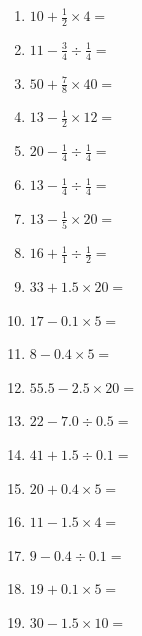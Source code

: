 \documentclass[12pt]{article}
\begin{document}
\begin{enumerate}
\item \large $ 10 + \frac{1}{2} \times 4 = $ \vspace{1.6cm}
\item \large $ 11 - \frac{3}{4} \div \frac{1}{4} = $ \vspace{1.6cm}
\item \large $ 50 + \frac{7}{8} \times 40 = $ \vspace{1.6cm}
\newpage
\item \large $ 13 - \frac{1}{2} \times 12 = $ \vspace{1.6cm}
\item \large $ 20 - \frac{1}{4} \div \frac{1}{4} = $ \vspace{1.6cm}
\item \large $ 13 - \frac{1}{4} \div \frac{1}{4} = $ \vspace{1.6cm}
\item \large $ 13 - \frac{1}{5} \times 20 = $ \vspace{1.6cm}
\item \large $ 16 + \frac{1}{1} \div \frac{1}{2} = $ \vspace{1.6cm}
\item \large $ 33 + 1.5 \times 20 = $ \vspace{1.6cm}
\item \large $ 17 - 0.1 \times 5 = $ \vspace{1.6cm}
\item \large $ 8 - 0.4 \times 5 = $ \vspace{1.6cm}
\item \large $ 55.5 - 2.5 \times 20 = $ \vspace{1.6cm}
\item \large $ 22 - 7.0 \div 0.5 = $ \vspace{1.6cm}
\newpage
\item \large $ 41 + 1.5 \div 0.1 = $ \vspace{1.6cm}
\item \large $ 20 + 0.4 \times 5 = $ \vspace{1.6cm}
\item \large $ 11 - 1.5 \times 4 = $ \vspace{1.6cm}
\item \large $ 9 - 0.4 \div 0.1 = $ \vspace{1.6cm}
\item \large $ 19 + 0.1 \times 5 = $ \vspace{1.6cm}
\item \large $ 30 - 1.5 \times 10 = $ \vspace{1.6cm}

\end{enumerate}
\end{document}
